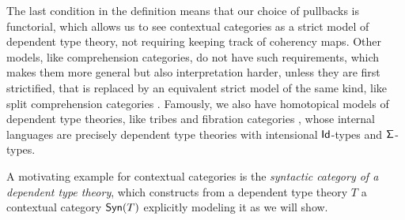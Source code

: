 \begin{rmk}
  The last condition in the definition means that our choice of pullbacks is
  functorial, which allows us to see contextual categories as a strict model of
  dependent type theory, not requiring keeping track of coherency maps.
  Other models, like comprehension categories, do not
  have such requirements, which makes them more general but also
  interpretation harder, unless they are first strictified, that is replaced by
  an equivalent strict model of the same kind, like split comprehension
  categories . Famously, we also have
  homotopical models of dependent type
  theories, like tribes and fibration categories , whose
  internal languages are precisely dependent type theories with intensional
  $\operatorname{\mathsf{Id}}$-types and $\operatorname{\mathsf{\Sigma}}$-types.
\end{rmk}

A motivating example for contextual categories is the \emph{syntactic category
of a dependent type theory}, which constructs from a dependent type theory $T$ a
contextual category $\operatorname{\mathsf{Syn}}(T)$ explicitly modeling it as we will show.


